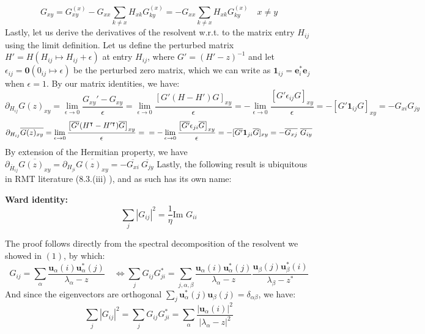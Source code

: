 \documentclass[11pt]{article}
\newenvironment{boxtheorem}[1]
  {\begin{mdframed}\noindent\textbf{#1}\itshape\space}
  {\end{mdframed}}
\newcommand{\im}{\text{Im }}
\begin{document}
\begin{equation*}
G_{xy} = G_{xy}^{(x)} - G_{xx}\sum_{k\neq x}H_{xk}G_{ky}^{(x)} =- G_{xx}\sum_{k\neq x}H_{xk}G_{ky}^{(x)}\quad x\neq y
\end{equation*}
Lastly, let us derive the derivatives of the resolvent w.r.t. to the matrix entry $H_{ij}$ using the limit definition. Let us define the perturbed matrix $H' = H(H_{ij}\mapsto H_{ij}+\epsilon)$ at entry $H_{ij}$, where $G' = (H'-z)^{-1}$ and let $\epsilon_{ij} = \mathbf{0}(0_{ij}\mapsto \epsilon)$ be the perturbed zero matrix, which we can write as $\mathbf{1}_{ij} = \mathbf{e}_i^*\mathbf{e}_j$ when $\epsilon=1$. By our matrix identities, we have: $$\partial_{H_{ij}}G(z)_{xy}=\lim_{\epsilon\rightarrow 0} \frac{G_{xy}'-G_{xy}}{\epsilon} = \lim_{\epsilon\rightarrow 0}\frac{\left[G'(H-H')G\right]_{xy}}{\epsilon} = -\lim_{\epsilon\rightarrow 0}\frac{\left[G'\epsilon_{ij}G\right]_{xy}}{\epsilon} = -[G'\mathbf{1}_{ij}G]_{xy} = -G_{xi}G_{jy}$$
\begin{equation*}\label{resolventderivative}
\partial_{H_{ij}}\overline{G(z)_{xy}}= \lim_{\epsilon\rightarrow 0}\frac{\left[\overline{G'}(H^\intercal-H'^\intercal)\overline{G}\right]_{xy}}{\epsilon} =\\\\= -\lim_{\epsilon\rightarrow 0}\frac{\left[\overline{G'}\epsilon_{ji}\overline{G}\right]_{xy}}{\epsilon} = -[\overline{G'}\mathbf{1}_{ji}\overline{G}]_{xy} = -\overline{G_{xj}}\ \overline{G_{iy}}
\end{equation*}
By extension of the Hermitian property, we have $\partial_{\overline{H}_{ij}} \overline{G(z)_{xy}} = \partial_{{H}_{ji}} \overline{G(z)_{xy}}  = -\overline{G_{xi}}\ \overline{G_{jy}}$
\noindent Lastly, the following result is ubiquitous in RMT literature (8.3.(iii) \cite{dynamic}), and as such has its own name: 
\begin{boxtheorem}{Ward identity: }\label{ward} $$\sum_j |G_{ij}|^2 = \frac{1}{\eta}\im G_{ii}$$\end{boxtheorem}
The proof follows directly from the spectral decomposition of the resolvent we showed in $(1)$, by which:
$$G_{ij} = \sum_{\alpha} \frac{\mathbf{u}_\alpha(i) \mathbf{u}_\alpha^*(j)}{\lambda_\alpha - z}\quad \Leftrightarrow \sum_j G_{ij} G_{ji}^* = \sum_{j, \alpha, \beta}\frac{\mathbf{u}_\alpha(i) \mathbf{u}_\alpha^*(j)}{\lambda_\alpha - z} \frac{\mathbf{u}_\beta(j) \mathbf{u}_\beta^*(i)}{\lambda_\beta - z^*}
$$
And since the eigenvectors are orthogonal $\sum_j \mathbf{u}_\alpha^*(j) \mathbf{u}_\beta(j) = \delta_{\alpha\beta}$, we have: $$\sum_j |G_{ij}|^2=\sum_j G_{ij} G_{ji}^* = \sum_\alpha \frac{|\mathbf{u}_\alpha(i)|^2}{|\lambda_\alpha - z|^2}$$ 
\end{document}
